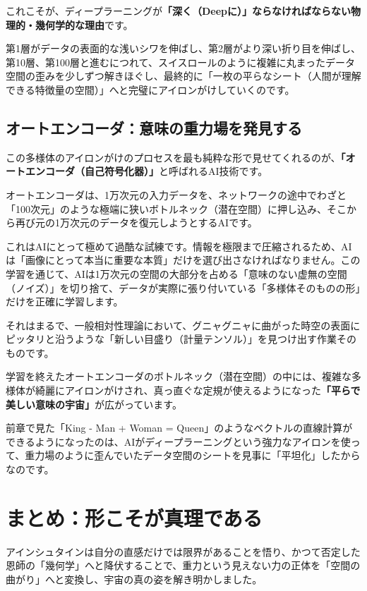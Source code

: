 これこそが、ディープラーニングが\textbf{「深く（Deepに）」ならなければならない物理的・幾何学的な理由}です。

第1層がデータの表面的な浅いシワを伸ばし、第2層がより深い折り目を伸ばし、第10層、第100層と進むにつれて、スイスロールのように複雑に丸まったデータ空間の歪みを少しずつ解きほぐし、最終的に「一枚の平らなシート（人間が理解できる特徴量の空間）」へと完璧にアイロンがけしていくのです。

\subsection{オートエンコーダ：意味の重力場を発見する}

この多様体のアイロンがけのプロセスを最も純粋な形で見せてくれるのが、\textbf{「オートエンコーダ（自己符号化器）」}と呼ばれるAI技術です。

オートエンコーダは、1万次元の入力データを、ネットワークの途中でわざと「100次元」のような極端に狭いボトルネック（潜在空間）に押し込み、そこから再び元の1万次元のデータを復元しようとするAIです。

これはAIにとって極めて過酷な試練です。情報を極限まで圧縮されるため、AIは「画像にとって本当に重要な本質」だけを選び出さなければなりません。この学習を通じて、AIは1万次元の空間の大部分を占める「意味のない虚無の空間（ノイズ）」を切り捨て、データが実際に張り付いている「多様体そのものの形」だけを正確に学習します。

それはまるで、一般相対性理論において、グニャグニャに曲がった時空の表面にピッタリと沿うような「新しい目盛り（計量テンソル）」を見つけ出す作業そのものです。

学習を終えたオートエンコーダのボトルネック（潜在空間）の中には、複雑な多様体が綺麗にアイロンがけされ、真っ直ぐな定規が使えるようになった\textbf{「平らで美しい意味の宇宙」}が広がっています。

前章で見た「King - Man + Woman = Queen」のようなベクトルの直線計算ができるようになったのは、AIがディープラーニングという強力なアイロンを使って、重力場のように歪んでいたデータ空間のシートを見事に「平坦化」したからなのです。

\section{まとめ：形こそが真理である}

アインシュタインは自分の直感だけでは限界があることを悟り、かつて否定した恩師の「幾何学」へと降伏することで、重力という見えない力の正体を「空間の曲がり」へと変換し、宇宙の真の姿を解き明かしました。

